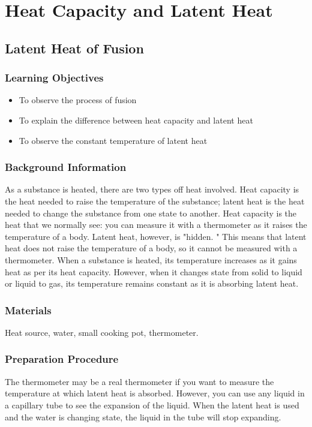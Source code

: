 \section{Heat Capacity and Latent Heat}

\subsection{Latent Heat of Fusion}

\subsubsection*{Learning Objectives}
\begin{itemize}
\item{To observe the process of fusion} 
\item{To explain the difference between heat capacity and latent heat} 
\item{To observe the constant temperature of latent heat} 
\end{itemize}

\subsubsection*{Background Information}
As a substance is heated, there are two types off heat involved. Heat capacity is the heat needed to raise the temperature of the substance; latent heat is the heat needed to change the substance from one state to another.  
Heat capacity is the heat that we normally see: you can measure it with a thermometer as it raises the temperature of a body. Latent heat, however, is "hidden.  " This means that latent heat does not raise the temperature of a body, so it cannot be measured with a thermometer.  
When a substance is heated, its temperature increases as it gains heat as per its heat capacity. However, when it changes state from solid to liquid or liquid to gas, its temperature remains constant as it is absorbing latent heat.  

\subsubsection*{Materials}
Heat source, water, small cooking pot, thermometer.

\subsubsection*{Preparation Procedure}
The thermometer may be a real thermometer if you want to measure the temperature at which latent heat is absorbed. However, you can use any liquid in a capillary tube to see the expansion of the liquid. When the latent heat is used and the water is changing state, the liquid in the tube will stop expanding.

